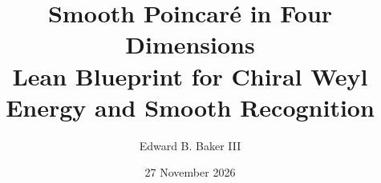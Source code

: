 \theoremstyle{definition}
\newtheorem{definition}{Definition}[section]
\newtheorem{openproblem}[definition]{Open problem}
\theoremstyle{plain}
\newtheorem{lemma}[definition]{Lemma}
\newtheorem{proposition}[definition]{Proposition}
\newtheorem{theorem}[definition]{Theorem}
\newtheorem{corollary}[definition]{Corollary}

\title{Smooth Poincar\'e in Four Dimensions\\[0.3em]\large Lean Blueprint for Chiral Weyl Energy and Smooth Recognition}
\author{Edward B. Baker III}
\date{27 November 2026}
